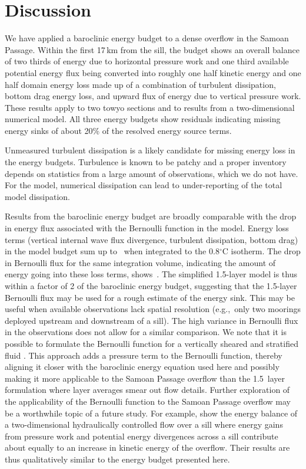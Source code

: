 \documentclass{ametsocV6.1}
\begin{document}
\section{Discussion}
\label{sec:Discussion}
We have applied a baroclinic energy budget to a dense overflow in the Samoan Passage.
Within the first 17\,km from the sill, the budget shows an overall balance of two thirds of energy due to horizontal pressure work and one third available potential energy flux being converted into roughly one half kinetic energy and one half domain energy loss made up of a combination of turbulent dissipation, bottom drag energy loss, and upward flux of energy due to vertical pressure work.
These results apply to two towyo sections and to results from a two-dimensional numerical model.
All three energy budgets show residuals indicating missing energy sinks of about 20\% of the resolved energy source terms.

Unmeasured turbulent dissipation is a likely candidate for missing energy loss in the energy budgets.
Turbulence is known to be patchy and a proper inventory depends on statistics from a large amount of observations, which we do not have.
For the model, numerical dissipation can lead to under-reporting of the total model dissipation.

Results from the baroclinic energy budget are broadly comparable with the drop in energy flux associated with the Bernoulli function in the model.
Energy loss terms (vertical internal wave flux divergence, turbulent dissipation, bottom drag) in the model budget sum up to \ModelLowerLossTerms\,\ModelLowerLossTermsUnit{} when integrated to the 0.8$^{\circ}$C isotherm.
The drop in Bernoulli flux for the same integration volume, indicating the amount of energy going into these loss terms, shows \ModelBernoulliDrop\,\ModelBernoulliDropUnit.
The simplified 1.5-layer model is thus within a factor of 2 of the baroclinic energy budget, suggesting that the 1.5-layer Bernoulli flux may be used for a rough estimate of the energy sink.
This may be useful when available observations lack spatial resolution (e.g.,~only two moorings deployed upstream and downstream of a sill).
The high variance in Bernoulli flux in the observations does not allow for a similar comparison.
We note that it is possible to formulate the Bernoulli function for a vertically sheared and stratified fluid \citep{wintersarmi14}.
This approach adds a pressure term to the Bernoulli function, thereby aligning it closer with the baroclinic energy equation used here and possibly making it more applicable to the Samoan Passage overflow than the 1.5~layer formulation where layer averages smear out flow details.
Further exploration of the applicability of the Bernoulli function to the Samoan Passage overflow may be a worthwhile topic of a future study.
For example, \citet[][their Fig.~12a]{wintersarmi14} show the energy balance of a two-dimensional hydraulically controlled flow over a sill where energy gains from pressure work and potential energy divergences across a sill contribute about equally to an increase in kinetic energy of the overflow.
Their results are thus qualitatively similar to the energy budget presented here.
\end{document}

